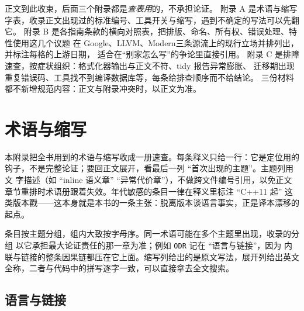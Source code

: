 \documentclass[12pt,a4paper,fontset=fandol]{ctexbook}
\newcommand{\cpp}[1]{C++#1}
\newcommand{\Tp}[1]{\texttt{#1}}
\newcommand{\Lang}[1]{\textsf{#1}}
\newcommand{\DomGo}{\Lang{Google}}
\newcommand{\DomLlvm}{\Lang{LLVM}}
\newcommand{\DomMod}{\Lang{Modern}}
\begin{document}
\begin{note}[title={附录预告：正文之后还有三份查表材料}]
  正文到此收束，后面三个附录都是\emph{查表用}的，不承担论证。
  附录 A 是术语与缩写字表，收录正文出现过的标准编号、工具开关与缩写，遇到不确定的写法可以先翻它。
  附录 B 是各指南条款的横向对照表，把排版、命名、所有权、错误处理、特性使用这几个议题
  在 \DomGo、\DomLlvm、\DomMod 三条源流上的现行立场并排列出，并标注每格的上游日期，
  适合在``别家怎么写''的争论里直接引用。
  附录 C 是排障速查，按症状组织：格式化器输出与正文不符、tidy 报告异常膨胀、
  迁移期出现重复错误码、工具找不到编译数据库等，每条给排查顺序而不给结论。
  三份材料都不新增规范内容：正文与附录冲突时，以正文为准。
\end{note}


\appendix
\chapter{术语与缩写}
\label{apx:terms}

本附录把全书用到的术语与缩写收成一册速查。每条释义只给一行：它是定位用的
钩子，不是完整论证；要回正文展开，看最后一列 ``首次出现的主题''。主题列用文
字描述（如 ``inline 语义章'' ``异常代价章''），不做跨文件编号引用，以免正文
章节重排时术语册跟着失效。年代敏感的条目一律在释义里标注 ``\cpp{11} 起''
这类版本戳——这本身就是本书的一条主张：脱离版本谈语言事实，正是译本漂移的
起点。

\begin{note}[title={怎么读这张术语册}]
条目按主题分组，组内大致按字母序。同一术语可能在多个主题里出现，收录的分组
以它承担最大论证责任的那一章为准；例如 \Tp{ODR} 记在 ``语言与链接''，因为
内联与链接的整条因果链都压在它上面。缩写列给出的是原文写法，展开列给出英文
全称，二者与代码中的拼写逐字一致，可以直接拿去全文搜索。
\end{note}

\section{语言与链接}
\end{document}
